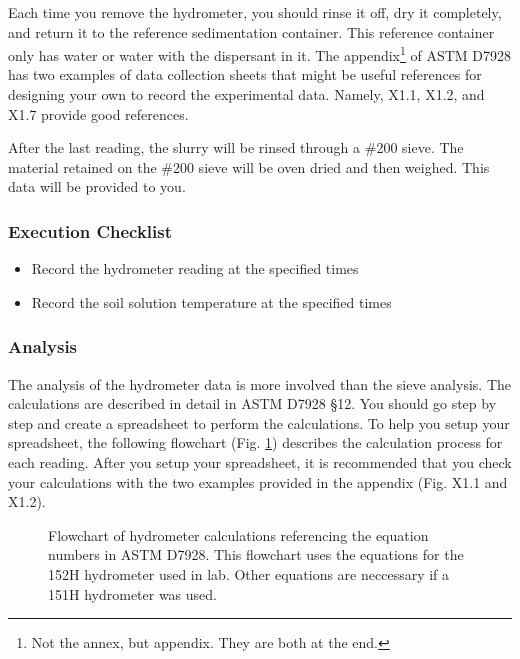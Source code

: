 \documentclass[12pt]{article}
\begin{document}
Each time you remove the hydrometer, you should rinse it off, dry it completely, and return it to the reference sedimentation container. This reference container only has water or water with the dispersant in it. The appendix\footnote{Not the annex, but appendix. They are both at the end.} of ASTM D7928 has two examples of data collection sheets that might be useful references for designing your own to record the experimental data. Namely, X1.1, X1.2, and X1.7 provide good references.

After the last reading, the slurry will be rinsed through a \#200 sieve. The material retained on the \#200 sieve will be oven dried and then weighed. This data will be provided to you.

\subsubsection*{Execution Checklist}
\begin{itemize}
    \item Record the hydrometer reading at the specified times
    \item Record the soil solution temperature at the specified times
\end{itemize}

\subsubsection{Analysis}
The analysis of the hydrometer data is more involved than the sieve analysis. The calculations are described in detail in ASTM D7928 \S12. You should go step by step and create a spreadsheet to perform the calculations. To help you setup your spreadsheet, the following flowchart (Fig. \ref{fig:D7928flowchart}) describes the calculation process for each reading. After you setup your spreadsheet, it is recommended that you check your calculations with the two examples provided in the appendix (Fig. X1.1 and X1.2).

\begin{figure}[H]
\centering
    \caption{Flowchart of hydrometer calculations referencing the equation numbers in ASTM D7928. This flowchart uses the equations for the 152H hydrometer used in lab. Other equations are neccessary if a 151H hydrometer was used.}
    \label{fig:D7928flowchart}
\end{figure}
\end{document}
